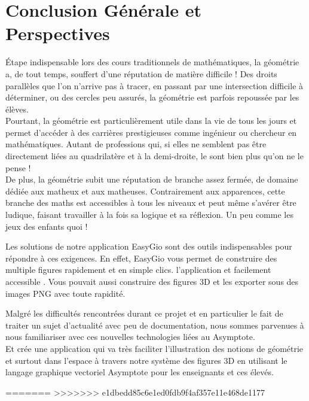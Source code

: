 \documentclass[a4paper]{report}
\begin{document}
\chapter*{Conclusion Générale et Perspectives}
Étape indispensable lors des cours traditionnels de mathématiques, la géométrie a, de tout temps, souffert d'une réputation de matière difficile ! Des droits parallèles que l'on n'arrive pas à tracer, en passant par une intersection difficile à déterminer, ou des cercles peu assurés, la géométrie est parfois repoussée par les élèves.\\
Pourtant, la géométrie est particulièrement utile dans la vie de tous les jours et permet d'accéder à des carrières prestigieuses comme ingénieur ou chercheur en mathématiques. Autant de professions qui, si elles ne semblent pas être directement liées au quadrilatère et à la demi-droite, le sont bien plus qu'on ne le pense !\\
De plus, la géométrie subit une réputation de branche assez fermée, de domaine dédiée aux matheux et aux matheuses. Contrairement aux apparences, cette branche des maths est accessibles à tous les niveaux et peut même s'avérer être ludique, faisant travailler à la fois sa logique et sa réflexion. Un peu comme les jeux des enfants quoi !\\
\par Les solutions de notre application EasyGio sont des outils indispensables pour répondre à ces exigences. En effet, EasyGio vous permet de construire des multiple figures rapidement et en simple clics. l'application et facilement accessible . Vous pouvait aussi construire des figures 3D et les exporter sous des images PNG avec toute rapidité.\\
\par Malgré les difficultés rencontrées durant ce projet et en particulier le fait de traiter un sujet d’actualité avec peu de documentation, nous sommes parvenues à nous familiariser avec ces nouvelles technologies liées au Asymptote.\\
Et crée une application qui va très faciliter l'illustration des notions de géométrie et surtout dans l'espace à travers notre système des figures 3D en utilisant le langage graphique vectoriel Asymptote pour les enseignants et ces élevés.\\ 
=======
>>>>>>> e1dbedd85c6e1ed0fdb9f4af357e11e468de1177
\end{document}

